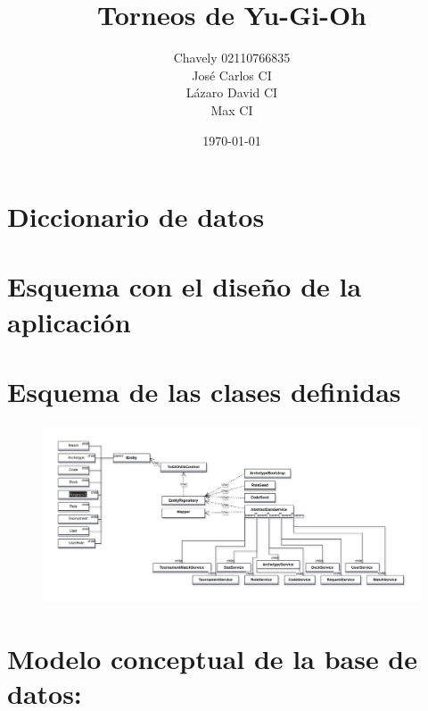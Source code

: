 \documentclass[a4paper]{article}
\begin{document}
\title{Torneos de Yu-Gi-Oh}
\author{
  \begin{tabular}{c}
    Chavely 02110766835 \\
    Jos\'e Carlos CI \\
    L\'azaro David CI \\
    Max CI
  \end{tabular}
}
\date{\today}
\maketitle
\newpage

\section{Diccionario de datos}

\newpage

\section{Esquema con el dise\~no de la aplicaci\'on}

\newpage

\section{Esquema de las clases definidas}

\begin{figure}[h]
  \centering
  \includegraphics[width=1\textwidth]{ClasesDefinidas.png}
  \label{fig:etiqueta}
\end{figure}

\newpage

\section{Modelo conceptual de la base de datos:}

\newpage
\end{document}
